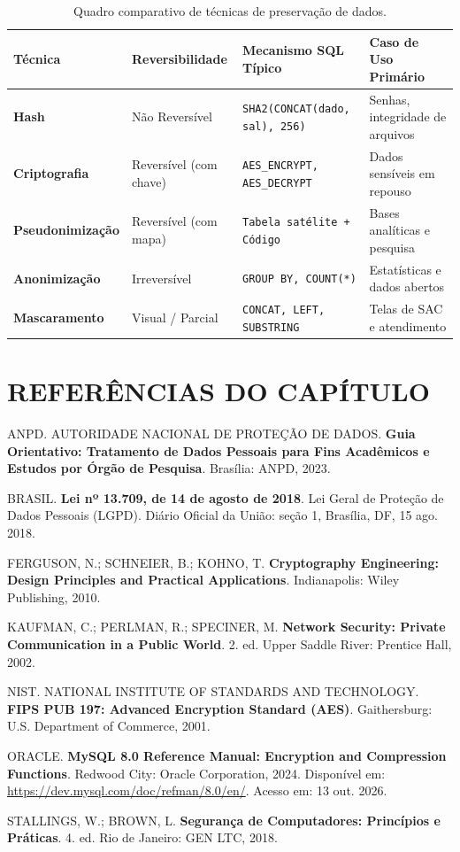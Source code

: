 \begin{table}[h!]
\centering
\small
\begin{tabular}{|l|l|l|l|}
\hline
\textbf{Técnica} & \textbf{Reversibilidade} & \textbf{Mecanismo SQL Típico} & \textbf{Caso de Uso Primário} \\ \hline
\textbf{Hash} & Não Reversível & \texttt{SHA2(CONCAT(dado, sal), 256)} & Senhas, integridade de arquivos \\ \hline
\textbf{Criptografia} & Reversível (com chave) & \texttt{AES\_ENCRYPT, AES\_DECRYPT} & Dados sensíveis em repouso \\ \hline
\textbf{Pseudonimização} & Reversível (com mapa) & \texttt{Tabela satélite + Código} & Bases analíticas e pesquisa \\ \hline
\textbf{Anonimização} & Irreversível & \texttt{GROUP BY, COUNT(*)} & Estatísticas e dados abertos \\ \hline
\textbf{Mascaramento} & Visual / Parcial & \texttt{CONCAT, LEFT, SUBSTRING} & Telas de SAC e atendimento \\ \hline
\end{tabular}
\caption{Quadro comparativo de técnicas de preservação de dados.}
\end{table}

\section*{REFERÊNCIAS DO CAPÍTULO}

\noindent ANPD. AUTORIDADE NACIONAL DE PROTEÇÃO DE DADOS. \textbf{Guia Orientativo: Tratamento de Dados Pessoais para Fins Acadêmicos e Estudos por Órgão de Pesquisa}. Brasília: ANPD, 2023.

\vspace{0.8em}
\noindent BRASIL. \textbf{Lei nº 13.709, de 14 de agosto de 2018}. Lei Geral de Proteção de Dados Pessoais (LGPD). Diário Oficial da União: seção 1, Brasília, DF, 15 ago. 2018.

\vspace{0.8em}
\noindent FERGUSON, N.; SCHNEIER, B.; KOHNO, T. \textbf{Cryptography Engineering: Design Principles and Practical Applications}. Indianapolis: Wiley Publishing, 2010.

\vspace{0.8em}
\noindent KAUFMAN, C.; PERLMAN, R.; SPECINER, M. \textbf{Network Security: Private Communication in a Public World}. 2. ed. Upper Saddle River: Prentice Hall, 2002.

\vspace{0.8em}
\noindent NIST. NATIONAL INSTITUTE OF STANDARDS AND TECHNOLOGY. \textbf{FIPS PUB 197: Advanced Encryption Standard (AES)}. Gaithersburg: U.S. Department of Commerce, 2001.

\vspace{0.8em}
\noindent ORACLE. \textbf{MySQL 8.0 Reference Manual: Encryption and Compression Functions}. Redwood City: Oracle Corporation, 2024. Disponível em: \url{https://dev.mysql.com/doc/refman/8.0/en/}. Acesso em: 13 out. 2026.

\vspace{0.8em}
\noindent STALLINGS, W.; BROWN, L. \textbf{Segurança de Computadores: Princípios e Práticas}. 4. ed. Rio de Janeiro: GEN LTC, 2018.
